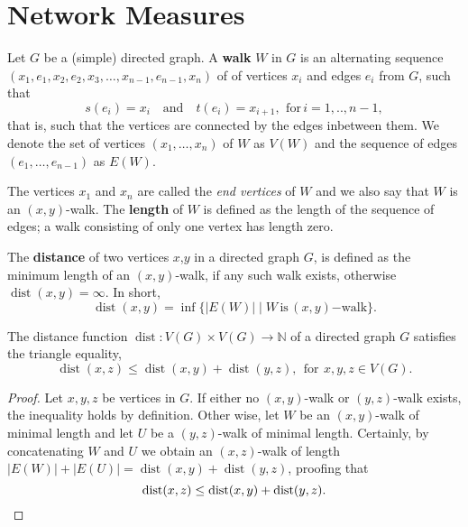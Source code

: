 







\section{Network Measures}\label{sec:network_measures}


Let $G$ be a (simple) directed graph. A \textbf{walk} $W$ in $G$ is an
alternating sequence
$(x_1,e_1,x_2,e_2,x_3,\ldots,x_{n-1},e_{n-1},x_n)$ of of vertices
$x_i$ and edges $e_i$ from $G$, such that
\[
s(e_i) = x_i \quad \mathrm{and} \quad t(e_i) = x_{i+1}, \:\,
\mathrm{for}\, i=1,..,n-1,
\]
that is, such that the vertices are connected by the edges inbetween
them. We denote the set of vertices $(x_1,\ldots,x_n)$ of $W$ as
$V(W)$ and the sequence of edges $(e_1,\dots,e_{n-1})$ as $E(W)$.

The vertices $x_1$ and $x_n$ are called the \textit{end vertices} of
$W$ and we also say that $W$ is an $(x,y)$-walk. The \textbf{length}
of $W$ is defined as the length of the sequence of edges; a walk
consisting of only one vertex has length zero.

\begin{definition}[Distance]
  The \textbf{distance} of two vertices $x$,$y$ in a directed graph
  $G$, is defined as the minimum length of an
  $(x,y)$-walk, if any such walk exists, otherwise
  $\operatorname{dist}(x,y)=\infty$. In short,
  \[
  \operatorname{dist}(x,y) = \inf \{|E(W)| \mid
  W\,\mathrm{is}\,(x,y)\mathrm{-walk}\}.
  \]
\end{definition}

\begin{proposition}
  The distance function $\operatorname{dist}: V(G) \times V(G) \to
  \mathbb{N}$ of a directed graph $G$ satisfies the triangle equality,
  \[
  \operatorname{dist}(x,z) \le \operatorname{dist}(x,y) +
  \operatorname{dist}(y,z), \:\: \mathrm{for}\:\, x,y,z \in V(G).
  \]
\end{proposition}

\begin{proof}
  Let $x,y,z$ be vertices in $G$. If either no $(x,y)$-walk or
  $(y,z)$-walk exists, the inequality holds by definition. Other wise,
  let $W$ be an $(x,y)$-walk of minimal length and let $U$ be a
  $(y,z)$-walk of minimal length. Certainly, by concatenating $W$ and
  $U$ we obtain an $(x,z)$-walk of length $|E(W)| + |E(U)| =
  \operatorname{dist}(x,y) + \operatorname{dist}(y,z)$, proofing
  that \[ \operatorname{dist}(x,z) \le \operatorname{dist}(x,y) +
  \operatorname{dist}(y,z).\qedhere\]\end{proof}



